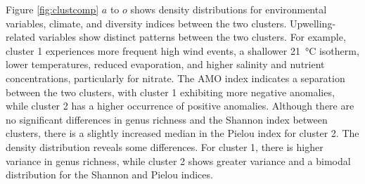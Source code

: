 \documentclass[draft]{agujournal2019}
\begin{document}
Figure \ref{fig:clustcomp} $a$ to $o$ shows density distributions for environmental variables, climate, and diversity indices between the two clusters. Upwelling-related variables show distinct patterns between the two clusters. For example, cluster 1 experiences more frequent high wind events, a shallower \qty{21}{\celsius} isotherm, lower temperatures, reduced evaporation, and higher salinity and nutrient concentrations, particularly for nitrate. The AMO index indicates a separation between the two clusters, with cluster 1 exhibiting more negative anomalies, while cluster 2 has a higher occurrence of positive anomalies. Although there are no significant differences in genus richness and the Shannon index between clusters, there is a slightly increased median in the Pielou index for cluster 2. The density distribution reveals some differences. For cluster 1, there is higher variance in genus richness, while cluster 2 shows greater variance and a bimodal distribution for the Shannon and Pielou indices. 
\end{document}
